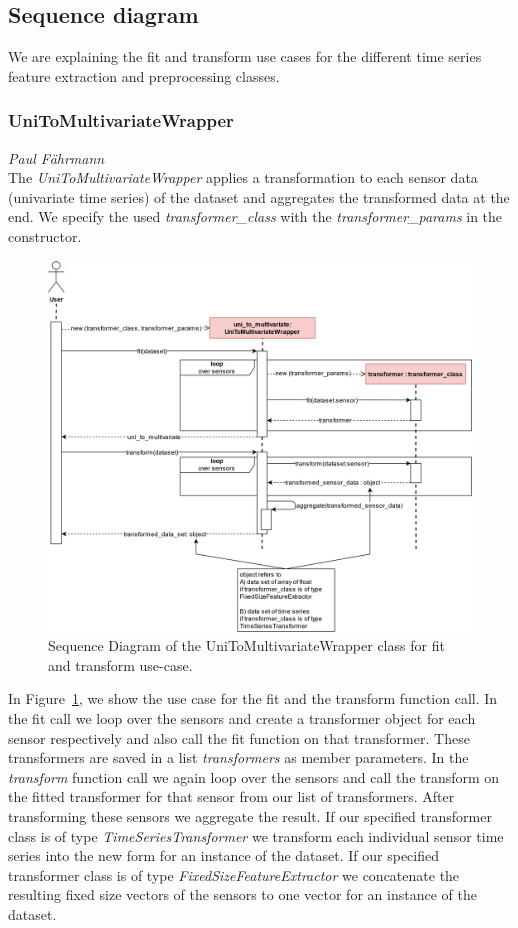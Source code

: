 \subsection*{Sequence diagram}
We are explaining the fit and transform use cases for the different time series feature extraction and preprocessing classes.
\subsubsection*{UniToMultivariateWrapper}
\vspace*{-10mm}\hfill{\normalsize\emph{Paul Fährmann}}
\\
The \textit{UniToMultivariateWrapper} applies a transformation to each sensor data (univariate time series) of the dataset and aggregates the transformed data at the end. We specify the used \textit{transformer\_class} with the \textit{transformer\_params} in the constructor.
\begin{figure}[ht]
    \centering
    \includegraphics[width=\textwidth]{gfx/uni_to_multi_sequence}
    \caption{Sequence Diagram of the UniToMultivariateWrapper class for fit and transform use-case.}
    \label{fig:uni-to-multi-seq}
\end{figure}
In Figure~\ref{fig:uni-to-multi-seq}, we show the use case for the fit and the transform function call. In the fit call we loop over the sensors and create a transformer object for each sensor respectively and also call the fit function on that transformer. These transformers are saved in a list \textit{transformers} as member parameters. In the \textit{transform} function call we again loop over the sensors and call the transform on the fitted transformer for that sensor from our list of transformers. After transforming these sensors we aggregate the result. If our specified transformer class is of type \textit{TimeSeriesTransformer} we transform each individual sensor time series into the new form for an instance of the dataset. If our specified transformer class is of type \textit{FixedSizeFeatureExtractor} we concatenate the resulting fixed size vectors of the sensors to one vector for an instance of the dataset.
